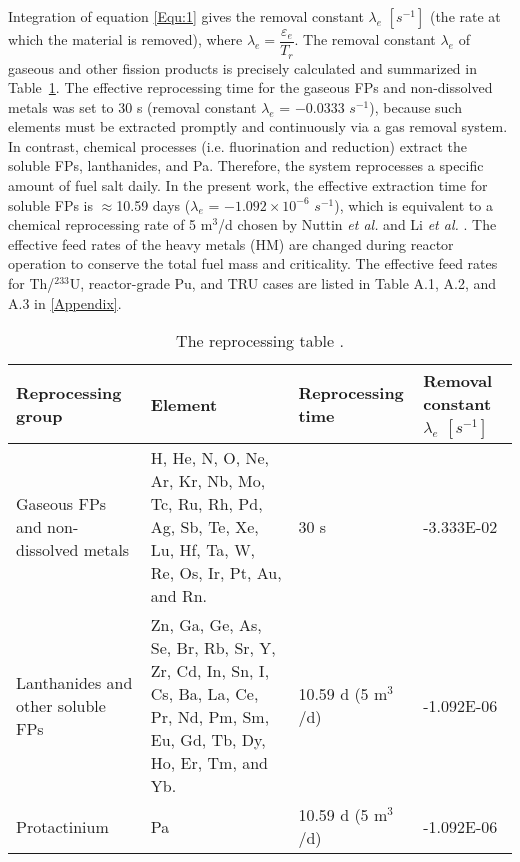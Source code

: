 Integration of equation \ref{Equ:1} gives the removal constant $\lambda_{e}$ $[s^{-1}]$ (the rate at which the material 
is removed), where $\lambda_{e}=\dfrac{{\varepsilon_{e}}}{{T}_{r}}$. The removal constant 
$\lambda_{e}$ of gaseous and other fission products is precisely calculated 
and summarized in Table~\ref{tab:table6}. The effective reprocessing time for 
the gaseous \gls{FPs} and non-dissolved metals was set to 30 s (removal 
constant $\lambda_{e}$ = $-0.0333$ $s^{-1}$), because such elements must be 
extracted promptly and continuously via a gas removal system. In contrast, 
chemical processes (i.e. fluorination and reduction) extract the soluble \gls{FPs}, lanthanides, and Pa.
Therefore, the system reprocesses a specific amount of fuel salt daily. In the 
present work, the effective extraction time for soluble \gls{FPs} is 
$\approx$10.59 days ($\lambda_{e}$ = $-1.092\times10^{-6}$ $s^{-1}$), which is 
equivalent to a chemical reprocessing rate of 5 m$^3$/d chosen by Nuttin \emph{et al.} \cite{nuttin2005potential} and Li \emph{et al.} \cite{li_optimization_2018}. The effective feed rates of 
the heavy metals (HM) are changed during reactor operation to conserve the 
total fuel mass and criticality. The effective feed rates for Th/$^{233}$U, reactor-grade Pu, and TRU cases are listed in Table A.1, A.2, and A.3 in \ref{Appendix}.


\begin{table}[ht!]
	\centering
	\caption{The reprocessing table \cite{ashraf2019whole_core,ashraf2019Preliminary}.} 
	\vspace{1ex}
	\begin{tabularx}{\textwidth}{|p{2.3cm}|p{4cm}|p{2.2cm}|p{1.9cm}|}
			\hline
			\textbf{Reprocessing group}  & \textbf{Element} & \textbf{Reprocessing time} & \textbf{Removal constant} $\lambda_{e}$ $[s^{-1}]$ \\
			\hline
			\raggedright Gaseous \gls{FPs} and non-dissolved metals  &  H, He, N, O, Ne, Ar, Kr, Nb, Mo, Tc, Ru, Rh, Pd, Ag, Sb, Te, Xe, Lu, Hf, Ta, W, Re, Os, Ir, Pt, Au, and Rn.		&	\raggedright 30 s	&  -3.333E-02 \\
			\hline
			\raggedright Lanthanides and other soluble \gls{FPs}     & 
			Zn, Ga, Ge, As, Se, Br, Rb, Sr, Y, Zr, Cd, In, Sn, I, Cs, Ba, La, Ce, Pr, Nd, Pm, Sm, Eu, Gd, Tb, Dy, Ho, Er, Tm, and Yb. & \raggedright 10.59 d (5 m$^3$/d) &  -1.092E-06 \\
			\hline
			Protactinium   & Pa  & \raggedright 10.59 d (5 m$^3$/d)  &  -1.092E-06 \\
			\hline
	\end{tabularx}
	\label{tab:table6}
\end{table}